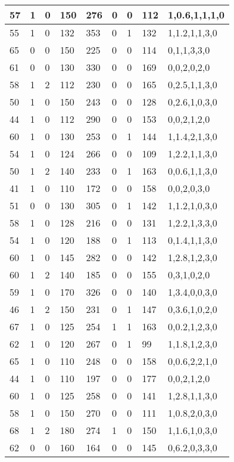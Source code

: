 \documentclass{article}
\begin{document}
\begin{table}[h!]
\begin{tabular}{|l|l|l|l|l|l|l|l|l|}
57 & 1 & 0 & 150 & 276 & 0 & 0 & 112 & 1,0.6,1,1,1,0 \\ \hline
55 & 1 & 0 & 132 & 353 & 0 & 1 & 132 & 1,1.2,1,1,3,0 \\ \hline
65 & 0 & 0 & 150 & 225 & 0 & 0 & 114 & 0,1,1,3,3,0 \\ \hline
61 & 0 & 0 & 130 & 330 & 0 & 0 & 169 & 0,0,2,0,2,0 \\ \hline
58 & 1 & 2 & 112 & 230 & 0 & 0 & 165 & 0,2.5,1,1,3,0 \\ \hline
50 & 1 & 0 & 150 & 243 & 0 & 0 & 128 & 0,2.6,1,0,3,0 \\ \hline
44 & 1 & 0 & 112 & 290 & 0 & 0 & 153 & 0,0,2,1,2,0 \\ \hline
60 & 1 & 0 & 130 & 253 & 0 & 1 & 144 & 1,1.4,2,1,3,0 \\ \hline
54 & 1 & 0 & 124 & 266 & 0 & 0 & 109 & 1,2.2,1,1,3,0 \\ \hline
50 & 1 & 2 & 140 & 233 & 0 & 1 & 163 & 0,0.6,1,1,3,0 \\ \hline
41 & 1 & 0 & 110 & 172 & 0 & 0 & 158 & 0,0,2,0,3,0 \\ \hline
51 & 0 & 0 & 130 & 305 & 0 & 1 & 142 & 1,1.2,1,0,3,0 \\ \hline
58 & 1 & 0 & 128 & 216 & 0 & 0 & 131 & 1,2.2,1,3,3,0 \\ \hline
54 & 1 & 0 & 120 & 188 & 0 & 1 & 113 & 0,1.4,1,1,3,0 \\ \hline
60 & 1 & 0 & 145 & 282 & 0 & 0 & 142 & 1,2.8,1,2,3,0 \\ \hline
60 & 1 & 2 & 140 & 185 & 0 & 0 & 155 & 0,3,1,0,2,0 \\ \hline
59 & 1 & 0 & 170 & 326 & 0 & 0 & 140 & 1,3.4,0,0,3,0 \\ \hline
46 & 1 & 2 & 150 & 231 & 0 & 1 & 147 & 0,3.6,1,0,2,0 \\ \hline
67 & 1 & 0 & 125 & 254 & 1 & 1 & 163 & 0,0.2,1,2,3,0 \\ \hline
62 & 1 & 0 & 120 & 267 & 0 & 1 & 99 & 1,1.8,1,2,3,0 \\ \hline
65 & 1 & 0 & 110 & 248 & 0 & 0 & 158 & 0,0.6,2,2,1,0 \\ \hline
44 & 1 & 0 & 110 & 197 & 0 & 0 & 177 & 0,0,2,1,2,0 \\ \hline
60 & 1 & 0 & 125 & 258 & 0 & 0 & 141 & 1,2.8,1,1,3,0 \\ \hline
58 & 1 & 0 & 150 & 270 & 0 & 0 & 111 & 1,0.8,2,0,3,0 \\ \hline
68 & 1 & 2 & 180 & 274 & 1 & 0 & 150 & 1,1.6,1,0,3,0 \\ \hline
62 & 0 & 0 & 160 & 164 & 0 & 0 & 145 & 0,6.2,0,3,3,0 \\ \hline

\end{tabular}
\end{table}
\end{document}
